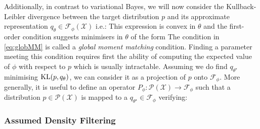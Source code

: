 \vspace*{2cm}
Additionally, in contrast to variational Bayes, we will now consider the Kullback-Leibler divergence between the target distribution $p$ and its approximate representation $q_{\theta}\in\mathcal F_{\phi}(\mathcal X)$ i.e.:
%
%
This expression is convex in $\theta$ and the first-order condition suggests minimisers in $\theta$ of the form
%
%
The condition in \eqref{eq:globMM} is called a \emph{global moment matching} condition. 
Finding a parameter meeting this condition requires first the ability of computing the expected value of $\phi$ with respect to $p$ which is usually intractable.
Assuming we do find $q_{\theta^{\star}}$ minimising $\mathrm{KL}\!\left(p,q_{\theta}\right)$, we can consider it as a projection of $p$ onto $\mathcal F_{\phi}$. More generally, it is useful to define an operator $P_{\phi}:\mathcal P(\mathcal X)\to\mathcal F_{\phi}$ such that a distribution $p\in\mathcal P(\mathcal X)$ is mapped to a $q_{\theta^{\star}}\in\mathcal F_{\phi}$ verifying:
%
%
\subsubsection{Assumed Density Filtering}

